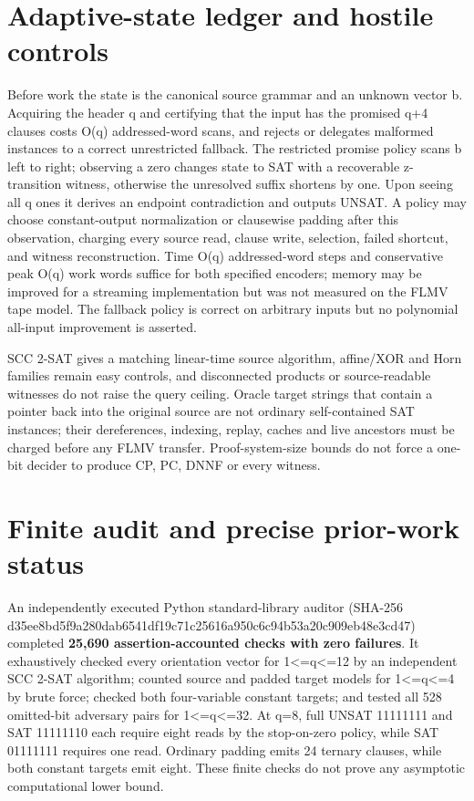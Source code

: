 \documentclass[11pt]{article}
\begin{document}
\section{Adaptive-state ledger and hostile controls}
Before work the state is the canonical source grammar and an unknown vector b. Acquiring the header q and certifying that the input has the promised q+4 clauses costs O(q) addressed-word scans, and rejects or delegates malformed instances to a correct unrestricted fallback. The restricted promise policy scans b left to right; observing a zero changes state to SAT with a recoverable z-transition witness, otherwise the unresolved suffix shortens by one. Upon seeing all q ones it derives an endpoint contradiction and outputs UNSAT. A policy may choose constant-output normalization or clausewise padding after this observation, charging every source read, clause write, selection, failed shortcut, and witness reconstruction. Time O(q) addressed-word steps and conservative peak O(q) work words suffice for both specified encoders; memory may be improved for a streaming implementation but was not measured on the FLMV tape model. The fallback policy is correct on arbitrary inputs but no polynomial all-input improvement is asserted.

SCC 2-SAT gives a matching linear-time source algorithm, affine/XOR and Horn families remain easy controls, and disconnected products or source-readable witnesses do not raise the query ceiling. Oracle target strings that contain a pointer back into the original source are not ordinary self-contained SAT instances; their dereferences, indexing, replay, caches and live ancestors must be charged before any FLMV transfer. Proof-system-size bounds do not force a one-bit decider to produce CP, PC, DNNF or every witness.

\section{Finite audit and precise prior-work status}
An independently executed Python standard-library auditor (SHA-256 d35ee8bd5f9a280dab6541df19c71c25616a950c6c94b53a20c909eb48e3cd47) completed \textbf{25,690 assertion-accounted checks with zero failures}. It exhaustively checked every orientation vector for 1<=q<=12 by an independent SCC 2-SAT algorithm; counted source and padded target models for 1<=q<=4 by brute force; checked both four-variable constant targets; and tested all 528 omitted-bit adversary pairs for 1<=q<=32. At q=8, full UNSAT 11111111 and SAT 11111110 each require eight reads by the stop-on-zero policy, while SAT 01111111 requires one read. Ordinary padding emits 24 ternary clauses, while both constant targets emit eight. These finite checks do not prove any asymptotic computational lower bound.
\end{document}
